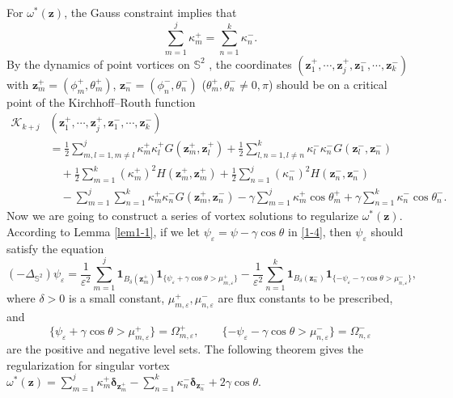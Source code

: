 \documentclass[12pt,reqno]{amsart}
\numberwithin{equation}{section}
\theoremstyle{definition}
\theoremstyle{remark}
\newcommand{\ep}{\varepsilon}
\begin{document}
   For $\omega^*(\boldsymbol z)$, the Gauss constraint implies that
   $$\sum\limits_{m=1}^{j}\kappa_m^+=\sum\limits_{n=1}^{k}\kappa_n^-.$$
   By the dynamics of point vortices on $\mathbb S^2$ \cite{Drit}, the coordinates $(\boldsymbol z_1^+,\cdots,\boldsymbol z_j^+, \boldsymbol z_1^-,\cdots, \boldsymbol z_k^-)$ with $\boldsymbol z_m^+=(\phi_m^+,\theta_m^+)$, $\boldsymbol z_n^-=(\phi_n^-,\theta_n^-)$ ($\theta_m^+,\theta_n^-\neq 0,\pi$) should be on a critical point of the Kirchhoff--Routh function
   \begin{equation}\label{1-7}
   	\begin{split}
   	\mathcal K_{k+j}&(\boldsymbol z_1^+,\cdots,\boldsymbol z_j^+,\boldsymbol z_1^-,\cdots,\boldsymbol z_k^-)\\
   	&=\frac{1}{2}\sum_{m,l=1,m\neq l}^j\kappa_m^+\kappa_l^+G(\boldsymbol z_m^+,\boldsymbol z_l^+)+\frac{1}{2}\sum_{l,n=1,l\neq n}^k\kappa_l^-\kappa_n^-G(\boldsymbol z_l^-,\boldsymbol z_n^-)\\
   	&\quad+\frac{1}{2}\sum_{m=1}^k(\kappa_m^+)^2H(\boldsymbol z_m^+,\boldsymbol z_m^+)+\frac{1}{2}\sum_{n=1}^j(\kappa_n^-)^2H(\boldsymbol z_n^-,\boldsymbol z_n^-)\\
   	&\quad-\sum_{m=1}^j\sum_{n=1}^k \kappa_m^+\kappa_n^- G(\boldsymbol z_m^+,\boldsymbol z_n^-)-\gamma\sum_{m=1}^j\kappa_m^+\cos \theta_m^++\gamma\sum_{n=1}^k\kappa_n^-\cos \theta_n^-.
   	\end{split}
   \end{equation}
   Now we are going to construct a series of vortex solutions to regularize $\omega^*(\boldsymbol z)$. According to Lemma \ref{lem1-1}, if we let $\psi_\ep=\psi-\gamma\cos\theta$ in \eqref{1-4}, then $\psi_\varepsilon$ should satisfy the equation
   \begin{equation}\label{1-8}
   	(-\Delta_{\mathbb S^2})\psi_\varepsilon=\frac{1}{\varepsilon^2}\sum_{m=1}^j\boldsymbol1_{B_\delta(\boldsymbol z_m^+)}\boldsymbol1_{\{\psi_\varepsilon+\gamma\cos\theta>\mu_{m,\varepsilon}^+\}}-\frac{1}{\varepsilon^2}\sum_{n=1}^k\boldsymbol1_{B_\delta(\boldsymbol z_n^-)}\boldsymbol1_{\{-\psi_\varepsilon-\gamma\cos\theta>\mu_{n,\varepsilon}^-\}},
   \end{equation}
   where $\delta>0$ is a small constant, $\mu_{m,\varepsilon}^+,\mu_{n,\varepsilon}^-$ are flux constants to be prescribed, and
   $$\{\psi_\varepsilon+\gamma\cos\theta>\mu_{m,\varepsilon}^+\}=\Omega_{m,\varepsilon}^+, \quad\quad \{-\psi_\varepsilon-\gamma\cos\theta>\mu_{n,\varepsilon}^-\}=\Omega_{n,\varepsilon}^-$$ 
   are the positive and negative level sets. The following theorem gives the regularization for singular vortex $\omega^*(\boldsymbol z)=\sum\limits_{m=1}^{j}\kappa_m^+\boldsymbol \delta_{\boldsymbol z_m^+}-\sum\limits_{n=1}^{k}\kappa_n^-\boldsymbol \delta_{\boldsymbol z_n^-}+2\gamma\cos\theta$.
   
\end{document}
